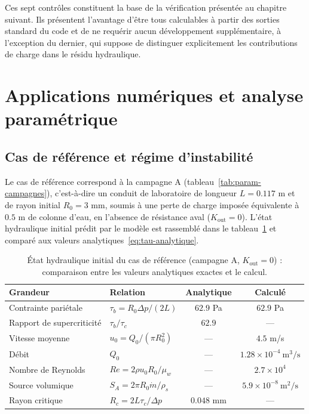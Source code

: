 \documentclass[11pt,a4paper]{report}
\newcommand{\kout}{K_{\mathrm{out}}}
\newcommand{\mdot}{\dot{m}}
\begin{document}
Ces sept contrôles constituent la base de la vérification présentée au chapitre suivant. Ils présentent
l'avantage d'être tous calculables à partir des sorties standard du code et de ne requérir aucun
développement supplémentaire, à l'exception du dernier, qui suppose de distinguer explicitement les
contributions de charge dans le résidu hydraulique.


\section{Applications numériques et analyse paramétrique}
\label{sec:resultats}

\subsection{Cas de référence et régime d'instabilité}

Le cas de référence correspond à la campagne A (tableau~\ref{tab:param-campagnes}), c'est-à-dire un conduit
de laboratoire de longueur \(L = 0.117\) m et de rayon initial \(R_0 = 3\) mm, soumis à une perte de charge
imposée équivalente à \(0.5\) m de colonne d'eau, en l'absence de résistance aval (\(\kout = 0\)). L'état
hydraulique initial prédit par le modèle est rassemblé dans le tableau~\ref{tab:etat-initial} et comparé aux
valeurs analytiques~\eqref{eq:tau-analytique}.

\begin{table}[H]
\centering
\caption{État hydraulique initial du cas de référence (campagne A, \(\kout=0\)) : comparaison entre les
valeurs analytiques exactes et le calcul.}
\label{tab:etat-initial}
\small
\begin{tabular}{llcc}
\toprule
Grandeur & Relation & Analytique & Calculé \\
\midrule
Contrainte pariétale & \(\tau_b = R_0\Delta p/(2L)\) & \(62.9\) Pa & \(62.9\) Pa \\
Rapport de supercriticité & \(\tau_b/\tau_c\) & \(62.9\) & --- \\
Vitesse moyenne & \(u_0 = Q_0/(\pi R_0^2)\) & --- & \(4.5\) m/s \\
Débit & \(Q_0\) & --- & \(1.28\times10^{-4}\ \mathrm{m^3/s}\) \\
Nombre de Reynolds & \(Re = 2\rho u_0R_0/\mu_w\) & --- & \(2.7\times10^{4}\) \\
Source volumique & \(S_A = 2\pi R_0\mdot/\rho_s\) & --- & \(5.9\times10^{-8}\ \mathrm{m^2/s}\) \\
Rayon critique & \(R_c = 2L\tau_c/\Delta p\) & \(0.048\) mm & --- \\
\bottomrule
\end{tabular}
\end{table}
\end{document}
